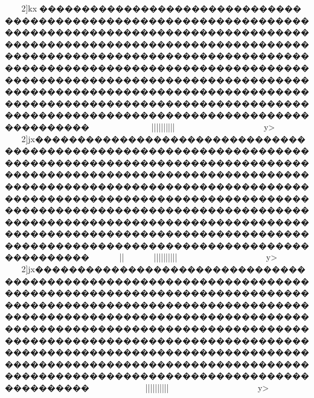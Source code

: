 {{{{{{{{{{{{{{{{{{{{{{{{{{{{{{{{{{{{{{{{{{{{{{{{{{{{{{{{{{{{{{{{{{{{{{{{{{{{{{{{{{{{{{{{{{{{{{{{{{{{{{{{{{{{{{{{{{{{{{{{{{{{{{{{{{{{{{{{{{{{{{{{{{{{{{{{{{{{{{{{{{{{{{{{{{{{{{{{{{{{{{{{{{{{{{{{{{{{{{{{{{{{{{{{{{{{{{{{{{{{{{{{{{{{{{{{{{{{{{{{{{{{{{{{{{{{{{{{{{{{{{{{{{{{{{{{{{{{{{{{{{{{{{{{{{{{{{{{{{{{{{{{{{{{{{{{{{{{{{{{{{{{{{{{{{{{{{{{{{{{{{{{{{{{{{{{{{{{{{{{{{{{{{{{{{{{{{{{{{{{{{{{{{{{{{{{{{{{{{{{{{{{{{{{{{{{{{{{{{{{{{{{{{{{{{{{{{{{{{{{{{{{{{{{{{{{{{{{{{{{{{{{{{{{{{{{{{{{{{{{{{{{{{{{{{{{{{{{{{{{{{{{{{{{{{{{{{{{{{{{{{{{{{{{{{{{{{{{{{{{{{{{{{{{{{{{{{{{{{{{{{{{{{{{{{{{{{{{{{{{{{{{{{{{{{{{{{{{{{{{{{{{{{{{{{{{{{{{{{{{{{{{{{{{{{{{{{{{{{{{{{{{{{{{{{{{{{{{{{{{{{{{{{{{{{{{{{{{{{{{{{{{{{{{{{{{{{{{{{{{{{{{{{{{{{{{{{{{{{{{{{{{{{{{{{{{{{{{{{{{{{{{{{{{{{{{{{{{{{{{{{{{{{{{{{{{{{{{{{{{{{{{{{{{{{{{{{{{{{{{{{{{{{{{{{{{{{{{{{{{{{{{{{{{{{{{{{{{{{{{{{{{{{{{{{{{{{{{{{{{{{{{{{{{{2]kx}�����������������������������������������������������������������������������������������������������������������������������������������������������������������������������������������������������������������������������������������������������������������������������������������������������������������������������������������������������������������������������~~~~~~~}~~~~~~}}}|||{{{{{{{{{{{{{{{{{{{{{{{{{{{{{{{{|||||||}}}}}}}}}~~~~~~~~~~~~~~~~y>
2]jx}������������������������������������������������������������������������������������������������������������������������������������������������������������������������������������������������������������������������������������������������������������������������������������������������������������������������������������������������������������������������������~~~~~~||~~~~~~~}}}|||{{{{{{{{{{{{{{{{{{{{{{{{{{{{{{{{|||||||}}}}}}}}}~~~~~~~~~~~~~~~~y>
2]jx}������������������������������������������������������������������������������������������������������������������������������������������������������������������������������������������������������������������������������������������������������������������������������������������������������������������������������������������������������������������������������~~~~~~}}~~~~~}}}|||{{{{{{{{{{{{{{{{{{{{{{{{{{{{{{{{|||||||}}}}}}}}}~~~~~~~~~~~~~~~~y>
}}}}}}}}}}}}}}}}}}}}}}}}}}}}}}}}}}}}}}}}}}}}}}}}}}}}}}}}}}}}}}}}}}}}}}}}}}}}}}}}}}}}}}}}}}}}}}}}}}}}}}}}}}}}}}}}}}}}}}}}}}}}}}}}}}}}}}}}}}}}}}}}}}}}}}}}}}}}}}}}}}}}}}}}}}}}}}}}}}}}}}}}}}}}}}}}}}}}}}}}}}}}}}}}}}}}}}}}}}}}}}}}}}}}}}}}}}}}}}}}}}}}}}}}}}}}}}}}}}}}}}}}}}}}}}}}}}}}}}}}}}}}}}}}}}}}}}}}}}}}}}}}}}}}}}}}}}}}}}}}}}}}}}}}}}}}}}}}}}}}}}}}}}}}}}}}}}}}}}}}}}}}}}}}}}}}}}}}}}}}}}}}}}}}}}}}}}}}}}}}}}}}}}}}}}}}}}}}}}}}}}}}}}}}}}}}}}}}}}}}}}}}}}}}}}}}}}}}}}}}}}}}}}}}}}}}}}}}}}}}}}}}}}}}}}}}}}}}}}}}}}}}}}}}}}}}}}}}}}}}}}}}}}}}}}}}}}}}}}}}}}}}}}}}}}}}}}}}}}}}}}}}}}}}}}}}}}}}}}}}}}}}}}}}}}}}}}}}}}}}}}}}}}}}}}}}}}}}}}}}}}}}}}}}}}}}}}}}}}}}}}}}}}}}}}}}}}}}}}}}}}}}}}}}}}}}}}}}}}}}}}}}}}}}}}}}}}}}}}}}}}}}}}}}}}}}}}}}}}}}}}}}}}}}}}}}}}}}}}}}}}}}}}}}}}}}}}}}}}}}}}}}}}}}}}}}}}}}}}}}}}}}}}}}}}}}}}}}}}}}}}}}}}}}}}}}}}}}}}}}}}}}}}}}}}}}}}}}}}}}}}}}}}}}}}}}}}}}}}}}}}}}}}}}}}}}}}}}}}}}}}}}}}}}}}}}}}}}}}}}}}}}}}}}}}}}}}}}}}}}}}}
